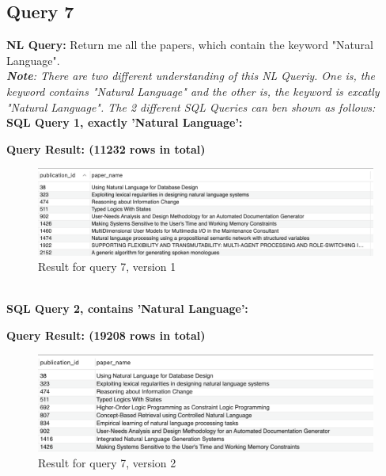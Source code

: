 \documentclass{article}
\begin{document}
\subsection{Query 7}
\textbf{NL Query:} Return me all the papers, which contain the keyword "Natural Language".
\vspace{6 pt}
\\
\textit{\textbf{Note}: There are two different understanding of this NL Queriy. One is, the keyword contains "Natural Language" and the other is, the keyword is excatly "Natural Language". The 2 different SQL Queries can ben shown as follows:}
\vspace{6pt}
\\
\textbf{SQL Query 1, exactly 'Natural Language':}

\newpage
\textbf{Query Result: (11232 rows in total)}
\begin{figure}[h]
	\centering
	\includegraphics[width=.55\textheight]{figures/q7_res1.png}
	\caption{Result for query 7, version 1}
	\label{fig:008}
\end{figure}
\\
\textbf{SQL Query 2, contains 'Natural Language':}

\textbf{Query Result: (19208 rows in total)}
\begin{figure}[h]
	\centering
	\includegraphics[width=.55\textheight]{figures/q7_res2.png}
	\caption{Result for query 7, version 2}
	\label{fig:017}
\end{figure}
\end{document}
